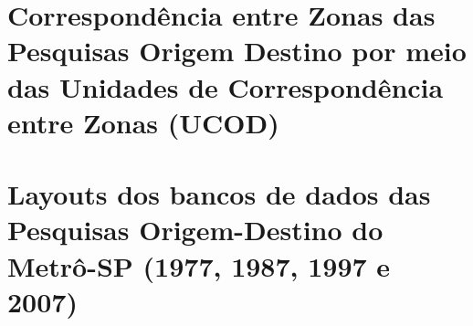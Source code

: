 \chapter{Correspondência entre Zonas das Pesquisas Origem Destino por meio das Unidades de Correspondência entre Zonas (UCOD)}\label{chap:anexo_ucod}



\chapter{Layouts dos bancos de dados das Pesquisas Origem-Destino do Metrô-SP (1977, 1987, 1997 e 2007)}\label{chap:anexo_layouts}




%



